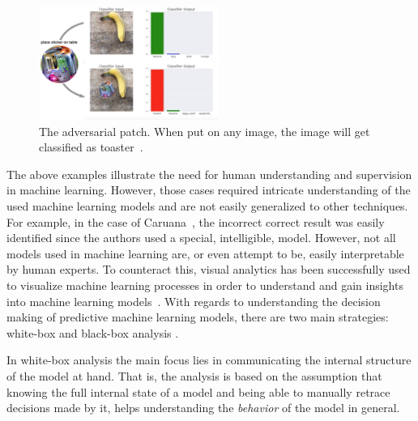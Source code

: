\begin{figure}
\centering
\includegraphics[height=10em]{tex/introduction/adversarialtoaster.png}
\caption[The adversarial patch.]{
The adversarial patch. When put on any image, the image will get classified as toaster~\cite{2017arXiv171209665B}.
}
\label{figs:toaster}
\end{figure}

The above examples illustrate the need for human understanding and supervision in machine learning.
However, those cases required intricate understanding of the used machine learning models and are not easily generalized to other techniques.
For example, in the case of Caruana~\etal\cite{Caruana:2015:IMH:2783258.2788613}, the incorrect correct result was easily identified since the authors used a special, intelligible, model.
However, not all models used in machine learning are, or even attempt to be, easily interpretable by human experts.
To counteract this, visual analytics has been successfully used to visualize machine learning processes in order to understand and gain insights into machine learning models~\cite{DBLP:journals/corr/StrobeltGHPR16,DBLP:journals/corr/abs-1710-06501,2017arXiv170401942K,DBLP:journals/corr/abs-1710-10777,8019879,8019872,DBLP:journals/tvcg/LiuXLWWZ18,8019878}. 
With regards to understanding the decision making of predictive machine learning models, there are two main strategies: white-box and black-box analysis \cite{class_signatures}.

In white-box analysis the main focus lies in communicating the internal structure of the model at hand. That is, the analysis is based on the assumption that knowing the full internal state of a model and being able to manually retrace decisions made by it, helps understanding the \emph{behavior} of the model in general.

